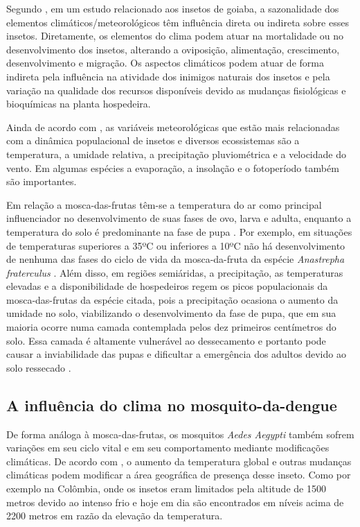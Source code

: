 Segundo , em um estudo relacionado aos insetos de goiaba, a sazonalidade dos elementos climáticos/meteorológicos têm influência direta ou indireta sobre esses insetos. Diretamente, os elementos do clima podem atuar na mortalidade ou no desenvolvimento dos insetos, alterando a oviposição, alimentação, crescimento, desenvolvimento e migração. Os aspectos climáticos podem atuar de forma indireta pela influência na atividade dos inimigos naturais dos insetos e pela variação na qualidade dos recursos disponíveis devido as mudanças fisiológicas e bioquímicas na planta hospedeira.

Ainda de acordo com , as variáveis meteorológicas que estão mais relacionadas com a dinâmica populacional de insetos e diversos ecossistemas são a temperatura, a umidade relativa, a precipitação pluviométrica e a velocidade do vento. Em algumas espécies a evaporação, a insolação e o fotoperíodo também são importantes.

Em relação a mosca-das-frutas têm-se a temperatura do ar como principal influenciador no desenvolvimento de suas fases de ovo, larva e adulta, enquanto a temperatura do solo é predominante na fase de pupa \cite{garcia1998influencia}. Por exemplo, em situações de temperaturas superiores a 35ºC ou inferiores a 10ºC não há desenvolvimento de nenhuma das fases do ciclo de vida da mosca-da-fruta da espécie \textit{Anastrepha fraterculus} \cite{araujo2008levantamento}. Além disso, em regiões semiáridas, a precipitação, as temperaturas elevadas e a disponibilidade de hospedeiros regem os picos populacionais da mosca-das-frutas da espécie citada, pois a precipitação ocasiona o aumento da umidade no solo, viabilizando o desenvolvimento da fase de pupa, que em sua maioria ocorre numa camada contemplada pelos dez primeiros centímetros do solo. Essa camada é altamente vulnerável ao dessecamento e portanto pode causar a inviabilidade das pupas e dificultar a emergência dos adultos devido ao solo ressecado \cite{calore2013fatores, araujo2008levantamento}.

\subsection{A influência do clima no mosquito-da-dengue}

De forma análoga à mosca-das-frutas, os mosquitos \textit{Aedes Aegypti} também sofrem variações em seu ciclo vital e em seu comportamento mediante modificações climáticas. De acordo com , o aumento da temperatura global e outras mudanças climáticas podem modificar a área geográfica de presença desse inseto. Como por exemplo na Colômbia, onde os insetos eram limitados pela altitude de 1500 metros devido ao intenso frio e hoje em dia são encontrados em níveis acima de 2200 metros em razão da elevação da temperatura.
 
